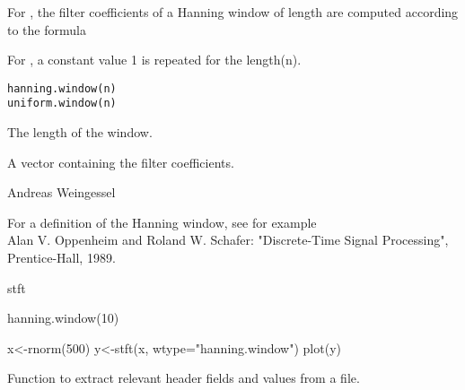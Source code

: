 \documentclass[a4paper]{book}
\begin{document}
%
\begin{Description}\relax
For , the filter coefficients  of a Hanning window of length 
 are computed according to the formula

For , a constant value 1 is repeated for the length(n).
\end{Description}
%
\begin{Usage}
\begin{verbatim}
hanning.window(n)
uniform.window(n)
\end{verbatim}
\end{Usage}
%
\begin{Arguments}
\begin{ldescription}
\item[\code{n}] The length of the window.
\end{ldescription}
\end{Arguments}
%
\begin{Value}
A vector containing the filter coefficients.
\end{Value}
%
\begin{Author}\relax
Andreas Weingessel
\end{Author}
%
\begin{References}\relax
For a definition of the Hanning window, see for example\\{}
Alan V. Oppenheim and Roland W. Schafer: "Discrete-Time Signal
Processing", Prentice-Hall, 1989.
\end{References}
%
\begin{SeeAlso}\relax
stft
\end{SeeAlso}
%
\begin{Examples}
\begin{ExampleCode}
hanning.window(10)

x<-rnorm(500)
y<-stft(x, wtype="hanning.window")
plot(y)
\end{ExampleCode}
\end{Examples}
%
\begin{Description}\relax
Function to extract relevant header fields and values from a file.
\end{Description}
\end{document}
